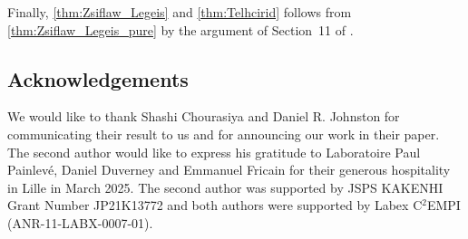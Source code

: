\documentclass[hidelinks]{amsart}
\numberwithin{equation}{section}
\theoremstyle{plain}
\theoremstyle{definition}
\begin{document}
Finally, \cref{thm:Zsiflaw_Legeis} and \cref{thm:Telhcirid} follows from \cref{thm:Zsiflaw_Legeis_pure}
by the argument of Section~11 of \cite{BhowmikSuzuki:Telhcirid}.

\subsection*{Acknowledgements}
We would like to thank Shashi Chourasiya and Daniel R. Johnston
for communicating  their result to us and for announcing our work in their paper.
The second author would like to express his gratitude to Laboratoire
Paul Painlev\'{e}, Daniel Duverney and Emmanuel Fricain for their generous hospitality in Lille in March 2025.
The second author was supported
by JSPS KAKENHI Grant Number JP21K13772
and  both authors were supported by Labex C$^{2}$EMPI (ANR-11-LABX-0007-01).


%
%
\end{document}

